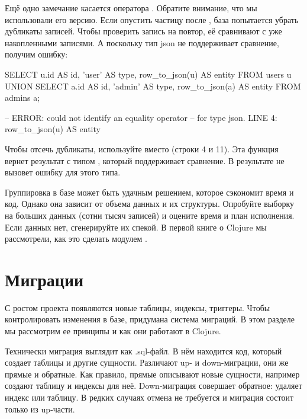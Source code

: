 Ещё одно замечание касается оператора . Обратите внимание, что мы использовали его  версию. Если опустить частицу  после , база попытается убрать дубликаты записей. Чтобы проверить запись на повтор, её сравнивают с уже накопленными записями. А поскольку тип json не поддерживает сравнение, получим ошибку:

\begin{english}
  \begin{sql/lines}
SELECT
  u.id AS id,
  'user' AS type,
  row_to_json(u) AS entity
FROM
  users u
UNION
SELECT
  a.id AS id,
  'admin' AS type,
  row_to_json(a) AS entity
FROM
  admins a;

-- ERROR: could not identify an equality operator
-- for type json. LINE 4: row_to_json(u) AS entity
  \end{sql/lines}
\end{english}

Чтобы отсечь дубликаты, используйте  вместо  (строки 4 и 11). Эта функция вернет результат с типом , который поддерживает сравнение. В результате  не вызовет ошибку для этого типа.

Группировка в базе может быть удачным решением, которое сэкономит время и код. Однако она зависит от объема данных и их структуры. Опробуйте выборку на больших данных (сотни тысяч записей) и оцените время и план исполнения. Если данных нет, сгенерируйте их спекой. В первой книге о Clojure мы рассмотрели, как это сделать модулем .

\section{Миграции}


С ростом проекта появляются новые таблицы, индексы, триггеры. Чтобы контролировать изменения в базе, придумана система миграций. В этом разделе мы рассмотрим ее принципы и как они работают в Clojure.

Технически миграция выглядит как .sql-файл. В нём находится код, который создает таблицы и другие сущности. Различают up- и down-миграции, они же прямые и обратные. Как правило, прямые описывают новые сущности, например создают таблицу и индексы для неё. Down-миграция совершает обратное: удаляет индекс или таблицу. В редких случаях отмена не требуется и миграция состоит только из up-части.

